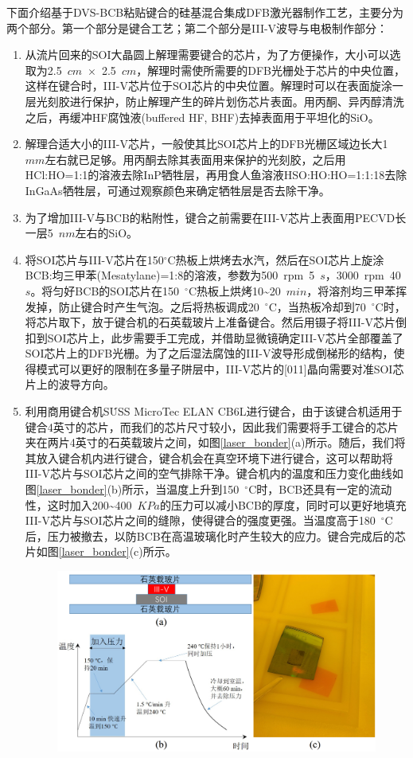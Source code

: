 下面介绍基于DVS-BCB粘贴键合的硅基混合集成DFB激光器制作工艺，主要分为两个部分。第一个部分是键合工艺；第二个部分是III-V波导与电极制作部分：
\begin{enumerate}[(1)]
	\item 
	从流片回来的SOI大晶圆上解理需要键合的芯片，为了方便操作，大小可以选取为2.5~$cm$~$\times$~2.5~$cm$，解理时需使所需要的DFB光栅处于芯片的中央位置，这样在键合时，III-V芯片位于SOI芯片的中央位置。解理时可以在表面旋涂一层光刻胶进行保护，防止解理产生的碎片划伤芯片表面。用丙酮、异丙醇清洗之后，再缓冲HF腐蚀液(buffered HF, BHF)去掉表面用于平坦化的SiO。
	\item 
	解理合适大小的III-V芯片，一般使其比SOI芯片上的DFB光栅区域边长大1~$mm$左右就已足够。用丙酮去除其表面用来保护的光刻胶，之后用HCl:HO=1:1的溶液去除InP牺牲层，再用食人鱼溶液HSO:HO:HO=1:1:18去除InGaAs牺牲层，可通过观察颜色来确定牺牲层是否去除干净。
	\item 
	为了增加III-V与BCB的粘附性，键合之前需要在III-V芯片上表面用PECVD长一层5~$nm$左右的SiO。
	\item 
	将SOI芯片与III-V芯片在150$^{\circ}$C热板上烘烤去水汽，然后在SOI芯片上旋涂BCB:均三甲苯(Mesatylane)=1:8的溶液，参数为500~rpm~5~$s$，3000~rpm~40~$s$。将匀好BCB的SOI芯片在150~$^{\circ}$C热板上烘烤10\~{}20~$min$，将溶剂均三甲苯挥发掉，防止键合时产生气泡。之后将热板调成20~$^{\circ}$C，当热板冷却到70~$^{\circ}$C时，将芯片取下，放于键合机的石英载玻片上准备键合。然后用镊子将III-V芯片倒扣到SOI芯片上，此步需要手工完成，并借助显微镜确定III-V芯片全部覆盖了SOI芯片上的DFB光栅。为了之后湿法腐蚀的III-V波导形成倒梯形的结构，使得模式可以更好的限制在多量子阱层中，III-V芯片的[011]晶向需要对准SOI芯片上的波导方向。
	\item 
	利用商用键合机S\.{U}SS MicroTec ELAN CB6L进行键合，由于该键合机适用于键合4英寸的芯片，而我们的芯片尺寸较小，因此我们需要将手工键合的芯片夹在两片4英寸的石英载玻片之间，如图\ref{laser_bonder}(a)所示。随后，我们将其放入键合机内进行键合，键合机会在真空环境下进行键合，这可以帮助将III-V芯片与SOI芯片之间的空气排除干净。键合机内的温度和压力变化曲线如图\ref{laser_bonder}(b)所示，当温度上升到150~$^{\circ}$C时，BCB还具有一定的流动性，这时加入200\~{}400~$KPa$的压力可以减小BCB的厚度，同时可以更好地填充III-V芯片与SOI芯片之间的缝隙，使得键合的强度更强。当温度高于180~$^{\circ}$C后，压力被撤去，以防BCB在高温玻璃化时产生较大的应力。键合完成后的芯片如图\ref{laser_bonder}(c)所示。
	\begin{figure}[htb]
		\centering
		\includegraphics[width=15cm]{./Pictures/laser_bonder.jpg}

\end{figure}
\end{enumerate}
